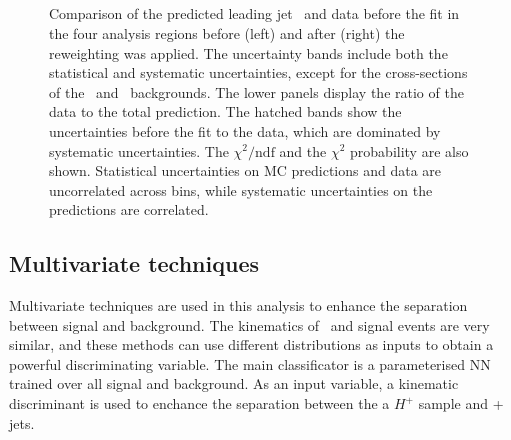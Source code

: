 \begin{figure}[htb]
    \RawFloats
    \begin{center}
     \\
       \\
      \\ 
      \\  
    \caption{Comparison of the predicted leading jet \pT\ and data before the fit in the four analysis regions before (left) and after (right) the reweighting was applied. The uncertainty bands include both the statistical and systematic uncertainties, except for the cross-sections of the \ttb\ and \ttc\ backgrounds.
    The lower panels display the ratio of the data to the total prediction. 
    The hatched bands show the uncertainties before the fit to the data,  which are dominated by systematic uncertainties. The $\chi^2/\mathrm{ndf}$ and the $\chi^2$ probability are also shown. Statistical uncertainties on MC predictions and data are uncorrelated across bins, while systematic uncertainties on the predictions are correlated.}
    \label{Hplustb:RWeffect}
\end{center}
\end{figure}
\clearpage
\subsection{Multivariate techniques}

Multivariate techniques are used in this analysis to enhance the separation between signal and background. The kinematics of \ttb\ and signal events are very similar, and these methods can use different distributions as inputs to obtain a powerful discriminating variable. The main classificator is a parameterised NN trained over all signal and background. As an input variable, a kinematic discriminant is used to enchance the separation between the a $H^+$ sample and \ttbar + jets.

